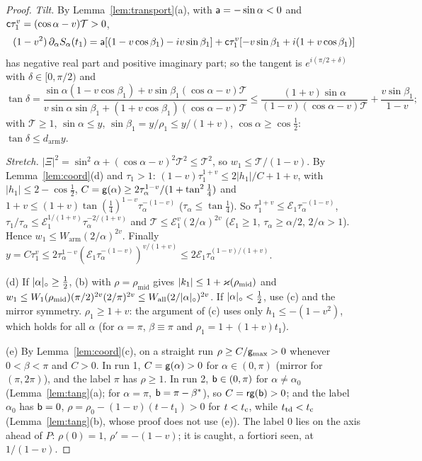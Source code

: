 \begin{proof}
\emph{Tilt.} By Lemma~\ref{lem:transport}(a), with $\mathsf a=-\sin\alpha<0$ and $\mathsf c\tau_1^v=(\cos\alpha-v)\mathcal T>0$,
\[
(1-v^2)\,\partial_\alpha S_\alpha(t_1)=\mathsf a[(1-v\cos\beta_1)-iv\sin\beta_1]+\mathsf c\tau_1^v[-v\sin\beta_1+i(1+v\cos\beta_1)]
\]
has negative real part and positive imaginary part; so the tangent is $e^{i(\pi/2+\delta)}$ with $\delta\in[0,\pi/2)$ and
\[
\tan\delta=\frac{\sin\alpha(1-v\cos\beta_1)+v\sin\beta_1(\cos\alpha-v)\mathcal T}{v\sin\alpha\sin\beta_1+(1+v\cos\beta_1)(\cos\alpha-v)\mathcal T}
\le\frac{(1+v)\sin\alpha}{(1-v)(\cos\alpha-v)\mathcal T}+\frac{v\sin\beta_1}{1-v};
\]
with $\mathcal T\ge1$, $\sin\alpha\le y$, $\sin\beta_1=y/\rho_1\le y/(1+v)$, $\cos\alpha\ge\cos\frac12$: $\tan\delta\le d_{\mathrm{arm}}y$.

\emph{Stretch.} $|\Xi|^2=\sin^2\!\alpha+(\cos\alpha-v)^2\mathcal T^2\le\mathcal T^2$, so $w_1\le\mathcal T/(1-v)$. By
Lemma~\ref{lem:coord}(d) and $\tau_1>1$: $(1-v)\tau_1^{1+v}\le2|h_1|/C+1+v$, with $|h_1|\le2-\cos\frac12$,
$C=\mathsf g(\alpha)\ge2\tau_\alpha^{1-v}/(1+\tan^2\frac14)$ and $1+v\le(1+v)\tan(\frac14)^{1-v}\tau_\alpha^{-(1-v)}$ ($\tau_\alpha\le\tan\frac14$).
So $\tau_1^{1+v}\le\mathcal E_1\tau_\alpha^{-(1-v)}$, $\tau_1/\tau_\alpha\le\mathcal E_1^{1/(1+v)}\tau_\alpha^{-2/(1+v)}$ and
$\mathcal T\le\mathcal E_1^{v}(2/\alpha)^{2v}$ ($\mathcal E_1\ge1$, $\tau_\alpha\ge\alpha/2$, $2/\alpha>1$). Hence
$w_1\le W_{\mathrm{arm}}(2/\alpha)^{2v}$. Finally $y=C\tau_1^v\le2\tau_\alpha^{1-v}(\mathcal E_1\tau_\alpha^{-(1-v)})^{v/(1+v)}\le
2\mathcal E_1\tau_\alpha^{(1-v)/(1+v)}$.

(d) If $|\alpha|_\circ\ge\frac12$, (b) with $\rho=\rho_{\mathrm{mid}}$ gives $|k_1|\le1+\varkappa(\rho_{\mathrm{mid}})$ and
$w_1\le W_1(\rho_{\mathrm{mid}})(\pi/2)^{2v}(2/\pi)^{2v}\le W_{\mathrm{all}}(2/|\alpha|_\circ)^{2v}$. If $|\alpha|_\circ<\frac12$, use (c) and
the mirror symmetry. $\rho_1\ge1+v$: the argument of (c) uses only $h_1\le-(1-v^2)$, which holds for all $\alpha$ (for $\alpha=\pi$,
$\beta\equiv\pi$ and $\rho_1=1+(1+v)t_1$).

(e) By Lemma~\ref{lem:coord}(c), on a straight run $\rho\ge C/\mathsf g_{\max}>0$ whenever $0<\beta<\pi$ and $C>0$. In run 1,
$C=\mathsf g(\alpha)>0$ for $\alpha\in(0,\pi)$ (mirror for $(\pi,2\pi)$), and the label $\pi$ has $\rho\ge1$. In run 2,
$\mathsf b\in(0,\pi)$ for $\alpha\ne\alpha_0$ (Lemma~\ref{lem:tang}(a); for $\alpha=\pi$, $\mathsf b=\pi-\beta^*$), so $C=\mathsf r\mathsf g(\mathsf b)>0$; and the
label $\alpha_0$ has $\mathsf b=0$, $\rho=\rho_0-(1-v)(t-t_1)>0$ for $t<t_{\mathrm c}$, while $t_{\mathrm{td}}<t_{\mathrm c}$ (Lemma~\ref{lem:tang}(b), whose proof does not
use (e)). The label $0$ lies on the axis ahead of $P$: $\rho(0)=1$, $\rho'=-(1-v)$; it is caught, a fortiori seen, at $1/(1-v)$.
\end{proof}


